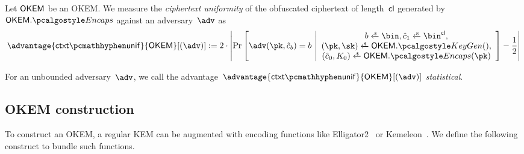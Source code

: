 \begin{definition}\label{def:ctxt-uniformity}
    Let $\mathsf{OKEM}$ be an OKEM.
    We measure the \emph{ciphertext uniformity} of the obfuscated ciphertext of length~$\mathsf{cl}$ generated by $\OKEM.\encaps$ against an adversary~$\adv$ as
    \[
        \advantage{\ctxtunif}{\OKEM}[(\adv)] := 
        2 \cdot \left|
        \Pr\left[
            \adv(\pk, \hat c_b) = b
        ~\middle|
            \begin{array}{c}
                b \getsr \bin, \hat c_1 \getsr \bin^{\obfctxtlen}, \\
                (\pk,\sk) \getsr \OKEM.\kgen(),\\
                (\hat c_0, K_0) \getsr \OKEM.\encaps(\pk)
            \end{array}
        \right]
        - \frac{1}{2}
        \right|
    \]
    
    For an unbounded adversary~$\adv$, we call the advantage~$\advantage{\ctxtunif}{\OKEM}[(\adv)] $ \emph{statistical}.
\end{definition}

\subsection{OKEM construction}

To construct an OKEM, a regular KEM can be augmented with encoding functions like \textsf{Elligator2}~\cite{CCS:BHKL13} or \textsf{Kemeleon}~\cite[Sec. 2.4]{CCS:GunSteVei24}. We define the following construct to bundle such functions.

